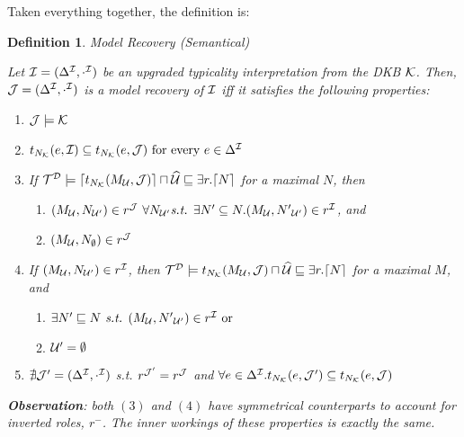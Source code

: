 \documentclass[draft]{article}
\newtheorem{definition}{Definition}
\begin{document}
Taken everything together, the definition is:

\begin{definition}{Model Recovery (Semantical)}
  \label{def:model_recovery}

   Let $\mathcal{I} = (\Delta^{\mathcal{I}}, \cdot^{\mathcal{I}})$ be an upgraded typicality interpretation from the DKB $\mathcal{K}$.
   Then, $\mathcal{J} = (\Delta^{\mathcal{I}}, \cdot^{\mathcal{I}})$ is a model recovery of $\mathcal{I}$ iff it satisfies the following properties:

   \begin{enumerate}
    \item  $\mathcal{J} \models \mathcal{K}$
    \item $t_{N_{\mathcal{K}}}({e}, {\mathcal{I}}) \subseteq t_{N_{\mathcal{K}}}({e}, {\mathcal{J}}) \text{ for every } e \in \Delta^{\mathcal{I}}$
    \item If $\mathcal{T}^{\mathcal{D}} \models  \lceil{\ensuremath{t_{N_{\mathcal{K}}}({{M}_{\mathcal{U}}}, {\mathcal{J}})}}\rceil \sqcap \widehat{{\mathcal{U}}}  \sqsubseteq \exists r.\lceil{N}\rceil$ for a maximal $N$, then  
        \begin{enumerate} 
            \item $({M}_{\mathcal{U}}, {N}_{\mathcal{U}'} ) \in r^{\mathcal{J}} \text{ } \forall {N}_{\mathcal{U}'} \textit{s.t. } \exists N'\subseteq N. ({M}_{\mathcal{U}}, {N'}_{\mathcal{U}'}) \in r^{\mathcal{I}}$, and 
            \item $({M}_{\mathcal{U}}, {N}_{\emptyset}) \in r^{\mathcal{J}}$
      \end{enumerate}
    \item If $({M}_{\mathcal{U}}, {N}_{\mathcal{U}'}) \in r^{\mathcal{I}}$, then $\mathcal{T}^{\mathcal{D}} \models t_{N_{\mathcal{K}}}({{M}_{\mathcal{U}}}, {\mathcal{J}}) \sqcap \widehat{{\mathcal{U}}} \sqsubseteq \exists r.\lceil{N}\rceil$ for a maximal $M$, and
        \begin{enumerate}
            \item $\exists N' \sqsubseteq N \textit{ s.t. } ({M}_{\mathcal{U}}, {N'}_{\mathcal{U}'}) \in r^{\mathcal{I}} \text{ or }$ 
            \item $\mathcal{U}' = \emptyset$
        \end{enumerate} 
    \item  $\nexists \mathcal{J}' = (\Delta^{\mathcal{I}}, \cdot^{\mathcal{I}})$ s.t. $r^{\mathcal{J}'} = r^{\mathcal{J}}$ and $\forall e \in \Delta^{\mathcal{I}}.t_{N_{\mathcal{K}}}({e}, {\mathcal{J}'}) \subseteq t_{N_{\mathcal{K}}}({e}, {\mathcal{J}})$
\end{enumerate}

{\color{red} \textbf{Observation}: both $(3)$ and $(4)$ have symmetrical counterparts to account for inverted roles, $r^{-}$. The inner workings of these properties is exactly the same.}

\end{definition}
\end{document}
